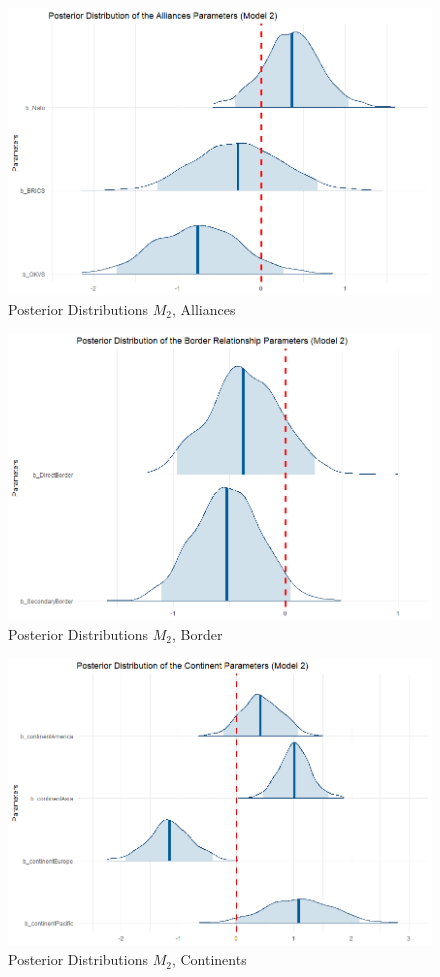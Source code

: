 \documentclass[12pt,a4paper]{article}
\begin{document}
\begin{figure}[h]
\center
\label{F:B1}
\includegraphics[scale=0.3]{PosteriorPlot_Alliances_Model2.png}
\caption{Posterior Distributions $M_2$, Alliances}
\end{figure}
\vfill
\begin{figure}[h]
\center
\label{F:B1}
\includegraphics[scale=0.3]{PosteriorPlot_Border_Model2.png}
\caption{Posterior Distributions $M_2$, Border}
\end{figure}
\vfill
\begin{figure}[h]
\center
\label{F:B1}
\includegraphics[scale=0.3]{PosteriorPlot_Continents_Model2.png}
\caption{Posterior Distributions $M_2$, Continents}
\end{figure}

\vfill
\end{document}
